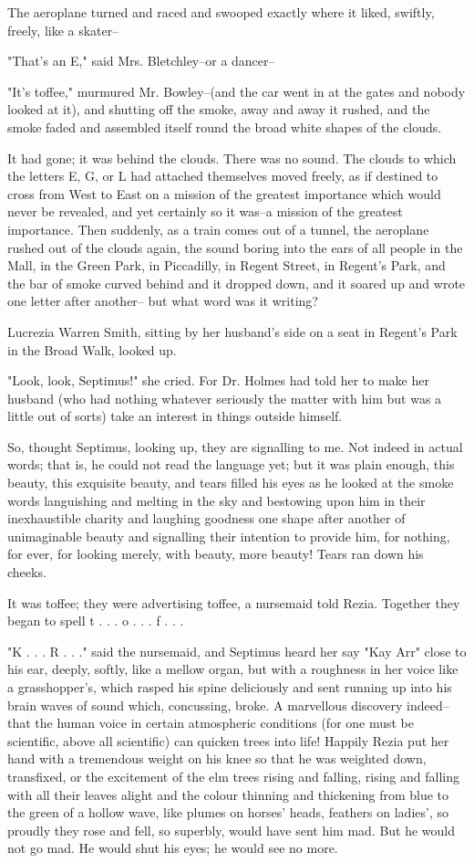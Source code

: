 \documentclass[lang=cn,10pt]{elegantbook}
\begin{document}
The aeroplane turned and raced and swooped exactly where it liked,
swiftly, freely, like a skater--

"That's an E," said Mrs. Bletchley--or a dancer--

"It's toffee," murmured Mr. Bowley--(and the car went in at the
gates and nobody looked at it), and shutting off the smoke, away
and away it rushed, and the smoke faded and assembled itself round
the broad white shapes of the clouds.

It had gone; it was behind the clouds.  There was no sound.  The
clouds to which the letters E, G, or L had attached themselves
moved freely, as if destined to cross from West to East on a
mission of the greatest importance which would never be revealed,
and yet certainly so it was--a mission of the greatest importance.
Then suddenly, as a train comes out of a tunnel, the aeroplane
rushed out of the clouds again, the sound boring into the ears of
all people in the Mall, in the Green Park, in Piccadilly, in Regent
Street, in Regent's Park, and the bar of smoke curved behind and it
dropped down, and it soared up and wrote one letter after another--
but what word was it writing?

Lucrezia Warren Smith, sitting by her husband's side on a seat in
Regent's Park in the Broad Walk, looked up.

"Look, look, Septimus!" she cried.  For Dr. Holmes had told her to
make her husband (who had nothing whatever seriously the matter
with him but was a little out of sorts) take an interest in things
outside himself.

So, thought Septimus, looking up, they are signalling to me.  Not
indeed in actual words; that is, he could not read the language
yet; but it was plain enough, this beauty, this exquisite beauty,
and tears filled his eyes as he looked at the smoke words
languishing and melting in the sky and bestowing upon him in their
inexhaustible charity and laughing goodness one shape after another
of unimaginable beauty and signalling their intention to provide
him, for nothing, for ever, for looking merely, with beauty, more
beauty!  Tears ran down his cheeks.

It was toffee; they were advertising toffee, a nursemaid told
Rezia.  Together they began to spell t . . . o . . . f . . .

"K . . . R . . ." said the nursemaid, and Septimus heard her say
"Kay Arr" close to his ear, deeply, softly, like a mellow organ,
but with a roughness in her voice like a grasshopper's, which
rasped his spine deliciously and sent running up into his brain
waves of sound which, concussing, broke.  A marvellous discovery
indeed--that the human voice in certain atmospheric conditions (for
one must be scientific, above all scientific) can quicken trees
into life!  Happily Rezia put her hand with a tremendous weight on
his knee so that he was weighted down, transfixed, or the
excitement of the elm trees rising and falling, rising and falling
with all their leaves alight and the colour thinning and thickening
from blue to the green of a hollow wave, like plumes on horses'
heads, feathers on ladies', so proudly they rose and fell, so
superbly, would have sent him mad.  But he would not go mad.  He
would shut his eyes; he would see no more.
\end{document}
